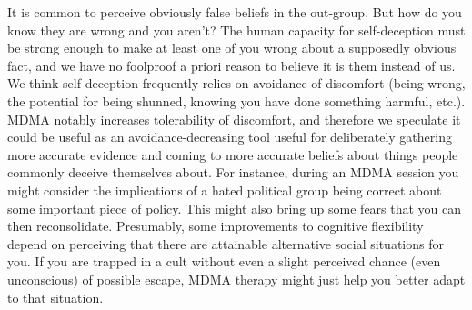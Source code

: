 \documentclass[12pt,letterpaper]{book}
\begin{document}
It is common to perceive obviously false beliefs in the out-group. But how do you know they are wrong and you aren't? The human capacity for self-deception must be strong enough to make at least one of you wrong about a supposedly obvious fact, and we have no foolproof a priori reason to believe it is them instead of us. We think self-deception frequently relies on avoidance of discomfort (being wrong, the potential for being shunned, knowing you have done something harmful, etc.). MDMA notably increases tolerability of discomfort, and therefore we speculate it could be useful as an avoidance-decreasing tool useful for deliberately gathering more accurate evidence and coming to more accurate beliefs about things people commonly deceive themselves about. For instance, during an MDMA session you might consider the implications of a hated political group being correct about some important piece of policy. This might also bring up some fears that you can then reconsolidate. Presumably, some improvements to cognitive flexibility depend on perceiving that there are attainable alternative social situations for you. If you are trapped in a cult without even a slight perceived chance (even unconscious) of possible escape, MDMA therapy might just help you better adapt to that situation.
\end{document}

